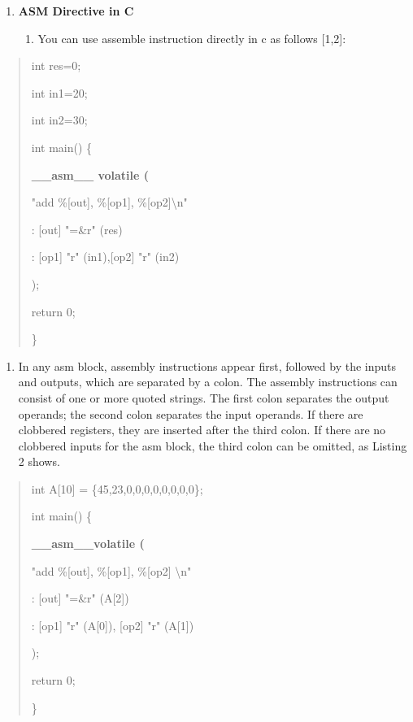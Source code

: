 \documentclass[
]{article}
\begin{document}
\begin{enumerate}
\def\labelenumi{\arabic{enumi}.}
\setcounter{enumi}{6}
\item
  \textbf{ASM Directive in C}

  \begin{enumerate}
  \def\labelenumii{\arabic{enumii}.}
  \item
    You can use assemble instruction directly in c as follows {[}1,2{]}:
  \end{enumerate}
\end{enumerate}

\begin{quote}
int res=0;

int in1=20;

int in2=30;

int main() \{

\textbf{\_\_asm\_\_ volatile (}

"add \%{[}out{]}, \%{[}op1{]}, \%{[}op2{]}\textbackslash n"

: {[}out{]} "=\&r" (res)

: {[}op1{]} "r" (in1),{[}op2{]} "r" (in2)

);

return 0;

\}
\end{quote}

\begin{enumerate}
\def\labelenumi{\arabic{enumi}.}
\setcounter{enumi}{1}
\item
  In any asm block, assembly instructions appear first, followed by the
  inputs and outputs, which are separated by a colon. The assembly
  instructions can consist of one or more quoted strings. The first
  colon separates the output operands; the second colon separates the
  input operands. If there are clobbered registers, they are inserted
  after the third colon. If there are no clobbered inputs for the asm
  block, the third colon can be omitted, as Listing 2 shows.
\end{enumerate}

\begin{quote}
int A{[}10{]} = \{45,23,0,0,0,0,0,0,0,0\};

int main() \{

\textbf{\_\_asm\_\_volatile (}

"add \%{[}out{]}, \%{[}op1{]}, \%{[}op2{]} \textbackslash n"

: {[}out{]} "=\&r" (A{[}2{]})

: {[}op1{]} "r" (A{[}0{]}), {[}op2{]} "r" (A{[}1{]})

);

return 0;

\}
\end{quote}
\end{document}
